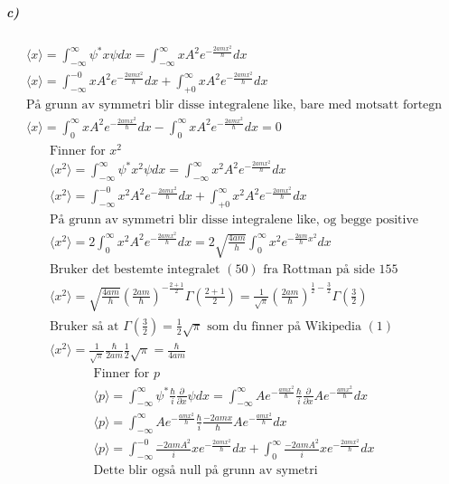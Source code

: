 \documentclass[11pt, A4paper,norsk]{article}
\begin{document}
			\subparagraph{c)}
				\begin{gather*}
\langle x \rangle = \int_{-\infty}^{\infty} \psi^{*} x \psi dx = \int_{-\infty}^{\infty} x A^2 e^{- \frac{2 a m x^2}{\hbar}} dx \\
\langle x \rangle = \int_{- \infty}^{- 0} x A^2 e^{- \frac{2 a m x^2}{\hbar}} dx + \int_{+ 0}^{\infty} x A^2 e^{- \frac{2 a m x^2}{\hbar}} dx \\
\text{På grunn av symmetri blir disse integralene like, bare med motsatt fortegn} \\
\langle x \rangle =  \int_{0}^{\infty} x A^2 e^{- \frac{2 a m x^2}{\hbar}} dx - \int_{0}^{\infty} x A^2 e^{- \frac{2 a m x^2}{\hbar}} dx = 0
				\end{gather*}
				\begin{gather*}
\text{Finner for $x^2$} \\
\langle x^2 \rangle = \int_{-\infty}^{\infty} \psi^{*} x^2 \psi dx = \int_{-\infty}^{\infty} x^2 A^2 e^{- \frac{2 a m x^2}{\hbar}} dx \\
\langle x^2 \rangle = \int_{- \infty}^{- 0} x^2 A^2 e^{- \frac{2 a m x^2}{\hbar}} dx + \int_{+ 0}^{\infty} x^2 A^2 e^{- \frac{2 a m x^2}{\hbar}} dx \\
\text{På grunn av symmetri blir disse integralene like, og begge positive} \\
\langle x^2 \rangle = 2 \int_{0}^{\infty} x^2 A^2 e^{- \frac{2 a m x^2}{\hbar}} dx = 2 \sqrt{\frac{4 a m}{h}} \int_{0}^{\infty} x^2 e^{- \frac{2 a m}{\hbar} x^2} dx \\
\text{Bruker det bestemte integralet $(50)$ fra Rottman på side $155$} \\
\langle x^2 \rangle = \sqrt{\frac{4 a m}{h}} \left( \frac{2 a m}{\hbar} \right)^{- \frac{2 + 1}{2}} \Gamma \left( \frac{2 + 1}{2} \right) = \frac{1}{\sqrt{\pi}} \left( \frac{2 a m}{\hbar} \right)^{\frac{1}{2} - \frac{3}{2}} \Gamma \left( \frac{3}{2} \right) \\
\text{Bruker så at $\Gamma \left( \frac{3}{2} \right) = \frac{1}{2} \sqrt{\pi}$ som du finner på Wikipedia $(1)$} \\
\langle x^2 \rangle = \frac{1}{\sqrt{\pi}} \frac{\hbar}{2 a m} \frac{1}{2} \sqrt{\pi} = \frac{\hbar}{4am}
				\end{gather*}
				\begin{gather*}
\text{Finner for $p$} \\
\langle p \rangle = \int_{-\infty}^{\infty} \psi^{*} \frac{\hbar}{i} \frac{\partial}{\partial x} \psi dx = \int_{-\infty}^{\infty} A e^{- \frac{a m x^2}{\hbar}} \frac{\hbar}{i} \frac{\partial}{\partial x} A e^{- \frac{a m x^2}{\hbar}} dx \\
\langle p \rangle = \int_{-\infty}^{\infty} A e^{- \frac{a m x^2}{\hbar}} \frac{\hbar}{i} \frac{-2amx}{\hbar} A e^{- \frac{a m x^2}{\hbar}} dx \\
\langle p \rangle = \int_{-\infty}^{-0} \frac{-2amA^2}{i} xe^{- \frac{2 a m x^2}{\hbar}}  dx + \int_{0}^{\infty} \frac{-2amA^2}{i} xe^{- \frac{2 a m x^2}{\hbar}}  dx \\
\text{Dette blir også null på grunn av symetri} \\
				\end{gather*}
\end{document}
